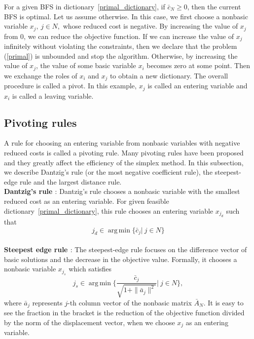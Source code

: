\documentclass[12pt]{article}
\DeclareMathOperator*{\argmin}{arg\,min}
\begin{document}
For a given BFS in dictionary~\eqref{primal_dictionary}, if $\bar{c}_N \ge 0$, then the current BFS is optimal. 
Let us assume otherwise. 
In this case, we first choose a nonbasic variable $x_j,~j\in N,$ whose reduced cost is negative. 
By increasing the value of $x_j$ from 0, we can reduce the objective function. 
If we can increase the value of $x_j$ infinitely without violating the constraints, then we declare that the problem (\ref{primal}) is unbounded and stop the algorithm. 
Otherwise, by increasing the value of $x_j$, the value of some basic variable $x_i$ becomes zero at some point. 
Then we exchange the roles of $x_i$ and $x_j$ to obtain a new dictionary.
The overall procedure is called a pivot.
In this example, $x_j$ is called an entering variable and $x_i$ is called a leaving variable.

\subsection{Pivoting rules} \label{Sec:pivoting-rules}

A rule for choosing an entering variable from nonbasic variables with negative reduced costs is called a pivoting rule.
Many pivoting rules have been proposed and they greatly affect the efficiency of the simplex method.
In this subsection, we describe Dantzig's rule (or the most negative coefficient rule), the steepest-edge rule and the largest distance rule.\\

{\bf Dantzig's rule \cite{dantzig1963}}: Dantzig's rule chooses a nonbasic variable with the smallest reduced cost as an entering variable.
For given feasible dictionary~\eqref{primal_dictionary}, this rule chooses an entering variable $x_{j_d}$ such that
\[
j_d \in \argmin\{\bar{c}_j|~j\in N\}
\]
\\

{\bf Steepest edge rule \cite{goldfarb1977, forrest1992}}: The steepest-edge rule focuses on the difference vector of basic solutions and the decrease in the objective value. 
Formally, it chooses a nonbasic variable $x_{j_s}$ which satisfies
\[
j_s\in\argmin\{\frac{\bar{c}_j}{\sqrt{1+\|\bar{a}_j\|^2}}|~j\in N\},
\]
where $\bar{a}_j$ represents $j$-th column vector of the nonbasic matrix $\bar{A}_N$. 
It is easy to see the fraction in the bracket is the reduction of the objective function divided by the norm of the displacement vector, when we choose $x_j$ as an entering variable. 
\\
\end{document}
